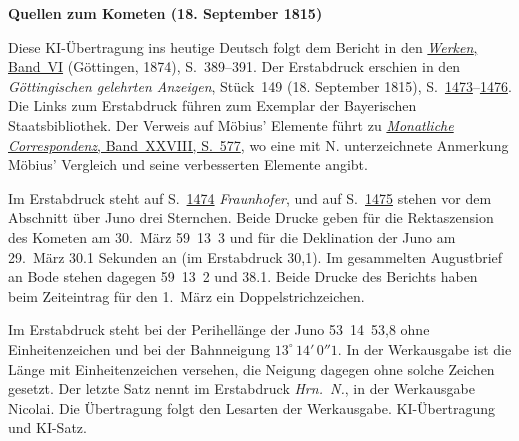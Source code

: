 \clearpage\thispagestyle{empty}
\begin{center}\textbf{Quellen zum Kometen (18. September 1815)}\end{center}
\noindent Diese KI-Übertragung ins heutige Deutsch folgt dem Bericht in den \href{https://gdz.sub.uni-goettingen.de/id/PPN236007467}{\textit{Werken}, Band~VI} (Göttingen, 1874), S.~389--391. Der Erstabdruck erschien in den \textit{Göttingischen gelehrten Anzeigen}, Stück~149 (18. September 1815), S.~\href{https://api.digitale-sammlungen.de/iiif/image/v2/bsb10538688_00113/full/1600,/0/default.jpg}{1473}--\href{https://api.digitale-sammlungen.de/iiif/image/v2/bsb10538688_00116/full/1600,/0/default.jpg}{1476}. Die Links zum Erstabdruck führen zum Exemplar der Bayerischen Staatsbibliothek. Der Verweis auf Möbius’ Elemente führt zu \href{https://api.digitale-sammlungen.de/iiif/image/v2/bsb10538617_00593/full/1600,/0/default.jpg}{\textit{Monatliche Correspondenz}, Band~XXVIII, S.~577}, wo eine mit N. unterzeichnete Anmerkung Möbius’ Vergleich und seine verbesserten Elemente angibt.
\par\smallskip\noindent Im Erstabdruck steht auf S.~\href{https://api.digitale-sammlungen.de/iiif/image/v2/bsb10538688_00114/full/1600,/0/default.jpg}{1474} \textit{Fraunhofer}, und auf S.~\href{https://api.digitale-sammlungen.de/iiif/image/v2/bsb10538688_00115/full/1600,/0/default.jpg}{1475} stehen vor dem Abschnitt über Juno drei Sternchen. Beide Drucke geben für die Rektaszension des Kometen am 30.~März 59~13~3 und für die Deklination der Juno am 29.~März 30.1 Sekunden an (im Erstabdruck 30,1). Im gesammelten Augustbrief an Bode stehen dagegen 59~13~2 und 38.1. Beide Drucke des Berichts haben beim Zeiteintrag für den 1.~März ein Doppelstrichzeichen.
\par\smallskip\noindent Im Erstabdruck steht bei der Perihellänge der Juno 53~14~53,8 ohne Einheitenzeichen und bei der Bahnneigung $13^\circ\,14'\,0''1$. In der Werkausgabe ist die Länge mit Einheitenzeichen versehen, die Neigung dagegen ohne solche Zeichen gesetzt. Der letzte Satz nennt im Erstabdruck \textit{Hrn.\ N.}, in der Werkausgabe Nicolai. Die Übertragung folgt den Lesarten der Werkausgabe. KI-Übertragung und KI-Satz.
\clearpage
